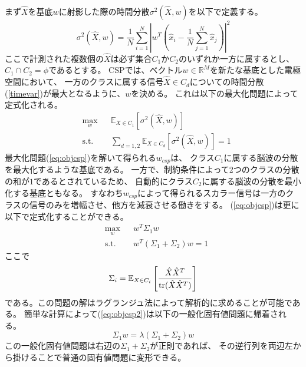 まず\(\hat X\)を基底\(w\)に射影した際の時間分散\(\sigma^2 (\hat X, w)\)を以下で定義する。
\begin{equation}
    \sigma^2 (\hat X, w)  = \frac{1}{N}\sum_{i=1}^N \left|w^T \left(\hat x_i - \frac{1}{N} \sum_{j=1}^N \hat x_j \right) \right|^2
    \label{timevar}
\end{equation}
ここで計測された複数個の\(\hat X\)は必ず集合\(C_1\)か\(C_2\)のいずれか一方に属するとし、
\(C_1 \cap C_2 = \phi \)であるとする。
CSPでは、ベクトル\(w \in \mathbb {R}^M\)を新たな基底とした電極空間において、
一方のクラスに属する信号\(\hat X \in {C_d}\)についての時間分散(\ref{timevar})が最大となるように、\(w\)を決める。
これは以下の最大化問題によって定式化される。
\begin{equation}
    \begin{aligned}
    & \max_w
    & & \mathbb E_{X \in C_1} \left[\sigma^2 (\hat X, w) \right] \\
    & \text{s.t.}
    & &  \sum_{d=1,2} \mathbb E_{X \in C_d} \left[\sigma^2 (\hat X, w) \right] = 1
    \end{aligned}
    \label{eq:objcsp}
\end{equation}
最大化問題(\ref{eq:objcsp})を解いて得られる\(w_{csp}\)は、
クラス\(C_1\)に属する脳波の分散を最大化するような基底である。
一方で、制約条件によって2つのクラスの分散の和が\(1\)であるとされているため、
自動的にクラス\(C_2\)に属する脳波の分散を最小化する基底ともなる。
すなわち\(w_{csp}\)によって得られるスカラー信号は一方のクラスの信号のみを増幅させ、他方を減衰させる働きをする。
(\ref{eq:objcsp})は更に以下で定式化することができる。
\begin{equation}
    \begin{aligned}
    & \max_w
    & & w^T\Sigma_1 w \\
    & \text{s.t.}
    & &  w^T(\Sigma_1+\Sigma_2)w = 1
    \end{aligned}
    \label{eq:objcsp2}
\end{equation}
ここで
\begin{equation}
    \Sigma_i = \mathbb E_{X\in C_i}\left[\frac{\hat X \hat X^T}{{\rm tr}(\hat X \hat X^T)}\right]
\end{equation}
である。この問題の解はラグランジュ法によって解析的に求めることが可能である。
簡単な計算によって(\ref{eq:objcsp2})は以下の一般化固有値問題に帰着される\cite{csp_eigen}。
\begin{equation}
    \Sigma_1w = \lambda(\Sigma_1+\Sigma_2)w
\end{equation}
この一般化固有値問題は右辺の\(\Sigma_1+\Sigma_2\)が正則であれば、
その逆行列を両辺左から掛けることで普通の固有値問題に変形できる。

